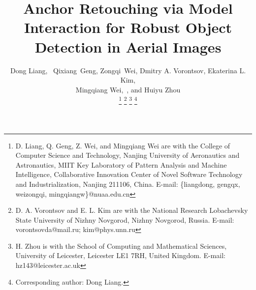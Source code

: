 \documentclass[journal]{IEEEtran}
\begin{document}
\title{Anchor Retouching via Model Interaction for Robust Object Detection in Aerial Images}


\author{Dong Liang,~
        Qixiang~Geng,
        Zongqi~Wei,
        Dmitry A. Vorontsov,
        Ekaterina L. Kim, \\
       Mingqiang Wei,~,
          and Huiyu Zhou
        
\thanks{D. Liang, Q. Geng, Z. Wei, and Mingqiang Wei are with the College of Computer Science and Technology, Nanjing University of Aeronautics and Astronautics, MIIT Key Laboratory of Pattern Analysis and Machine Intelligence, Collaborative Innovation Center of Novel Software Technology and Industrialization, Nanjing 211106, China. E-mail: \{liangdong, gengqx, weizongqi, mingqiangw\}@nuaa.edu.cn}
\thanks{D. A. Vorontsov and E. L. Kim are with the National Research Lobachevsky State University of Nizhny Novgorod, Nizhny Novgorod, Russia.  E-mail: vorontsovda@mail.ru; kim@phys.unn.ru}
\thanks{H. Zhou is with the School of Computing and Mathematical Sciences, University of Leicester, Leicester LE1 7RH, United Kingdom. E-mail: hz143@leicester.ac.uk}
\thanks{ Corresponding author: Dong Liang.}}










\maketitle
\end{document}
